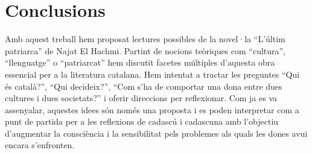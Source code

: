 \section{Conclusions}

Amb aquest treball hem proposat lectures possibles de la novel·la ``L'últim patriarca'' de Najat El Hachmi.
Partint de nocions teòriques com ``cultura'', ``llenguatge'' o ``patriarcat'' hem discutit facetes múltiples d'aquesta obra essencial per a la literatura catalana.
Hem intentat a tractar les preguntes ``Qui és català?'', ``Qui decideix?'', ``Com s’ha de comportar una dona entre dues cultures i dues societats?''
i oferir direccions per reflexionar.
Com ja es va assenyalar, aquestes idees són només una proposta i es poden interpretar com a punt de partida per a les reflexions de cadascú i cadascuna amb l'objectiu d'augmentar la consciència i la sensibilitat pels problemes als quals les dones avui encara s'enfronten.

\begin{comment}
[Vidal2012]
"Y el mundo de El Hachmi no es sino un
palimpsesto, por eso también lo son sus libros, tablillas en la que se aprecian hue-
llas de escrituras/culturas anteriores y en las que leemos la última, que se nos apa-
rece más perceptible. Sin embargo, las huellas persisten."


\end{comment}
